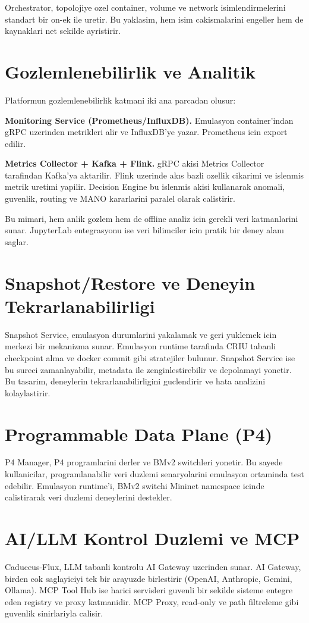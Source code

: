 \documentclass[conference]{IEEEtran}
\begin{document}
Orchestrator, topolojiye ozel container, volume ve network isimlendirmelerini standart bir on-ek ile uretir. Bu yaklasim, hem isim cakismalarini engeller hem de kaynaklari net sekilde ayristirir.

\section{Gozlemlenebilirlik ve Analitik}
Platformun gozlemlenebilirlik katmani iki ana parcadan olusur:

\textbf{Monitoring Service (Prometheus/InfluxDB).} Emulasyon container'indan gRPC uzerinden metrikleri alir ve InfluxDB'ye yazar. Prometheus icin export edilir.

\textbf{Metrics Collector + Kafka + Flink.} gRPC akisi Metrics Collector tarafindan Kafka'ya aktarilir. Flink uzerinde akıs bazli ozellik cikarimi ve islenmis metrik uretimi yapilir. Decision Engine bu islenmis akisi kullanarak anomali, guvenlik, routing ve MANO kararlarini paralel olarak calistirir.

Bu mimari, hem anlik gozlem hem de offline analiz icin gerekli veri katmanlarini sunar. JupyterLab entegrasyonu ise veri bilimciler icin pratik bir deney alanı saglar.

\section{Snapshot/Restore ve Deneyin Tekrarlanabilirligi}
Snapshot Service, emulasyon durumlarini yakalamak ve geri yuklemek icin merkezi bir mekanizma sunar. Emulasyon runtime tarafinda CRIU tabanli checkpoint alma ve docker commit gibi stratejiler bulunur. Snapshot Service ise bu sureci zamanlayabilir, metadata ile zenginlestirebilir ve depolamayi yonetir. Bu tasarim, deneylerin tekrarlanabilirligini guclendirir ve hata analizini kolaylastirir.

\section{Programmable Data Plane (P4)}
P4 Manager, P4 programlarini derler ve BMv2 switchleri yonetir. Bu sayede kullanicilar, programlanabilir veri duzlemi senaryolarini emulasyon ortaminda test edebilir. Emulasyon runtime'i, BMv2 switchi Mininet namespace icinde calistirarak veri duzlemi deneylerini destekler.

\section{AI/LLM Kontrol Duzlemi ve MCP}
Caduceus-Flux, LLM tabanli kontrolu AI Gateway uzerinden sunar. AI Gateway, birden cok saglayiciyi tek bir arayuzde birlestirir (OpenAI, Anthropic, Gemini, Ollama). MCP Tool Hub ise harici servisleri guvenli bir sekilde sisteme entegre eden registry ve proxy katmanidir. MCP Proxy, read-only ve path filtreleme gibi guvenlik sinirlariyla calisir.
\end{document}
